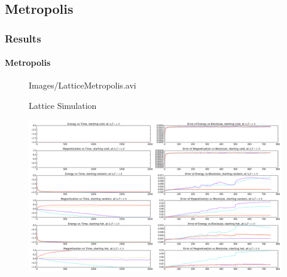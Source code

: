 \subsection{Metropolis}
\begin{frame}
\frametitle{Results}
\framesubtitle{Metropolis}
	\begin{figure}[h!]
		\centering
		{Images/LatticeMetropolis.avi}
		\caption{Lattice Simulation}
	\end{figure}
\end{frame}
\begin{frame}
	\begin{figure}
		\centering
		\includegraphics[width=1.0\textwidth]{Images/MC1}
	\end{figure}
\end{frame}
